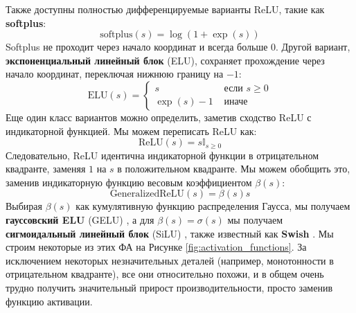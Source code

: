 Также доступны полностью дифференцируемые варианты ReLU, такие как \textbf{softplus}:
%
\begin{equation}
\text{softplus}(s)=\log(1+\exp(s))
\label{eq:softplus}
\end{equation}
%
Softplus не проходит через начало координат и всегда больше $0$. Другой вариант, \textbf{экспоненциальный линейный блок} (ELU), сохраняет прохождение через начало координат, переключая нижнюю границу на $-1$:
%
\begin{equation}
\text{ELU}(s)=\begin{cases} s & \text{ если } s \ge 0 \\ \exp(s)-1 & \text{ иначе } \end{cases}
\label{eq:elu}
\end{equation}
%
Еще один класс вариантов можно определить, заметив сходство ReLU с индикаторной функцией. Мы можем переписать ReLU как:
%
$$
\text{ReLU}(s)=s \mathbb{I}_{s \ge 0}
$$
%
Следовательно, ReLU идентична индикаторной функции в отрицательном квадранте, заменяя $1$ на $s$ в положительном квадранте. Мы можем обобщить это, заменив индикаторную функцию весовым коэффициентом $\beta(s)$:
%
$$
\text{GeneralizedReLU}(s)=\beta(s)s
$$
%
Выбирая $\beta(s)$ как кумулятивную функцию распределения Гаусса, мы получаем \textbf{гауссовский ELU} (GELU) \cite{hendrycks2016gaussian}, а для $\beta(s) = \sigma(s)$ мы получаем \textbf{сигмоидальный линейный блок} (SiLU)  \cite{hendrycks2016gaussian}, также известный как \textbf{Swish} \cite{ramachandran2017searching}. Мы строим некоторые из этих ФА на Рисунке \ref{fig:activation_functions}. За исключением некоторых незначительных деталей (например, монотонности в отрицательном квадранте), все они относительно похожи, и в общем очень трудно получить значительный прирост производительности, просто заменив функцию активации.

